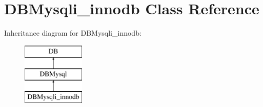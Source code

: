 \hypertarget{classDBMysqli__innodb}{}\section{D\+B\+Mysqli\+\_\+innodb Class Reference}
\label{classDBMysqli__innodb}
Inheritance diagram for D\+B\+Mysqli\+\_\+innodb\+:\begin{figure}[H]
\begin{center}
\leavevmode
\includegraphics[height=3.000000cm]{classDBMysqli__innodb}
\end{center}
\end{figure}
